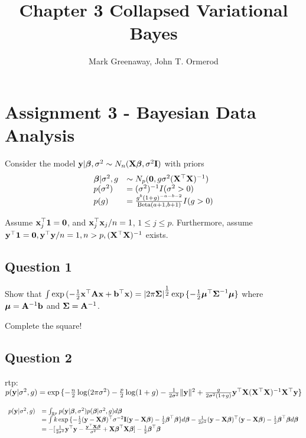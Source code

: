 \documentclass{article}[12pt]
\title{Chapter 3 Collapsed Variational Bayes}
\author{Mark Greenaway, John T. Ormerod}
\begin{document}
\maketitle

\section{Assignment 3 - Bayesian Data Analysis}

Consider the model ${\bf y} | {\boldsymbol \beta}, \sigma^2 \sim N_n({\bf X} {\boldsymbol \beta}, \sigma^2 {\bf I})$ with priors
\begin{equation*}
\begin{array}{ll}
{\boldsymbol\beta} | \sigma^2, g &\sim N_p({\bf 0}, g \sigma^2({\bf X}^\top {\bf X})^{-1}) \\
p(\sigma^2) &= (\sigma^2)^{-1} I(\sigma^2 > 0) \\
p(g) &= \frac{g^b (1 + g)^{-a - b - 2}}{\text{Beta}(a + 1, b + 1)} I(g > 0)
\end{array}
\end{equation*}

Assume ${\bf x}_j^\top{\bf1} = {\bf 0}$, and ${\bf x}_j^\top {\bf x}_j / n = 1$, $1 \leq j \leq p$.
Furthermore, assume ${\bf y}^\top {\bf1} = {\bf 0}, {\bf y}^\top {\bf y} / n  = 1, n > p, ({\bf X}^\top {\bf X})^{-1}$ exists.

\subsection{Question 1}

Show that $\int \exp{(-{\tfrac{1}{2}}{\bf x}^\top {\bf A}{\bf x}+ {\bf b}^\top {\bf x})} = |2 \pi {\boldsymbol\Sigma}|^{{\tfrac{1}{2}}} \exp{\{ -{\tfrac{1}{2}}{\boldsymbol\mu}^\top {\boldsymbol\Sigma}^{-1} {\boldsymbol\mu}\}}$ where ${\boldsymbol \mu} = {\bf A}^{-1} {\bf b}$ and ${\boldsymbol \Sigma} = {\bf A}^{-1}$.

Complete the square!

\subsection{Question 2}

rtp: $p({\bf y} | \sigma^2, g) = \exp{\{ - \frac{n}{2} \log (2 \pi \sigma^2) - \frac{p}{2} \log(1 + g) - \frac{1}{2 \sigma^2} \| {\bf y}\|^2  + \frac{g}{2 \sigma^2 (1 + g)} {\bf y}^\top {\bf X}({\bf X}^\top {\bf X})^{-1} {\bf X}^\top {\bf y}\}}$

\begin{equation*}
\begin{array}{ll}
p({\bf y} | \sigma^2, g) &= \int_{{\mathbb R}^p} p({\bf y} | {\boldsymbol \beta}, \sigma^2) p({\boldsymbol \beta} | \sigma^2, g) d {\boldsymbol \beta} \\
&= \int k \exp{\{ -{\tfrac{1}{2}}({\bf y}- {\bf X}{\boldsymbol\beta})^\top \sigma^{-2} {\bf I}({\bf y}- {\bf X}{\boldsymbol\beta}) - {\tfrac{1}{2}}{\boldsymbol\beta}^\top {\boldsymbol\beta}\}} d {\boldsymbol \beta} - \frac{1}{2 \sigma^2} ({\bf y} - {\bf X} {\boldsymbol \beta})^\top ({\bf y} - {\bf X} {\boldsymbol \beta}) -{\tfrac{1}{2}} {\boldsymbol \beta}^\top {\boldsymbol\beta} d {\boldsymbol \beta} \\
&= -[\frac{1}{2 \sigma^2} {\bf y}^\top {\bf y} - \frac{{\bf y}^\top {\bf X} {\boldsymbol\beta}}{\sigma^2} + {\bf X} {\boldsymbol \beta}^\top {\bf X} {\boldsymbol\beta}] - {\tfrac{1}{2}} {\boldsymbol \beta}^\top {\boldsymbol\beta}
\end{array}
\end{equation*}
\end{document}
